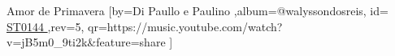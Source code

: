 \beginsong
{Amor de Primavera %
}[by={Di Paullo e Paulino %
},album={@walyssondosreis},
id={\href{https://music.youtube.com/watch?v=jB5m0_9ti2k&feature=share %
}{ ST0144 %
}},rev={5}, %
qr={https://music.youtube.com/watch?v=jB5m0_9ti2k&feature=share %
}]
\beginverse
